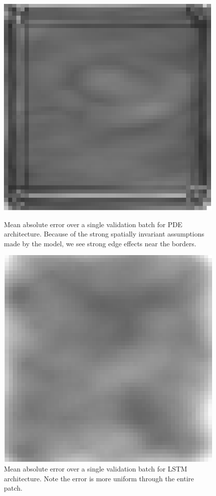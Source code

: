 \documentclass[12pt]{article}
\theoremstyle{plain}
\theoremstyle{remark}
\theoremstyle{definition}
\begin{document}
\begin{figure}
	\begin{minipage}[t]{0.45\linewidth}
		\centering
		\includegraphics[width=0.7\linewidth]{pde_prediction}
		\caption{Mean absolute error over a single validation batch for PDE architecture. Because of the strong spatially invariant assumptions made by the model, we see strong edge effects near the borders. }
		\label{fig:pdeprediction}
	\end{minipage}
	\begin{minipage}[t]{0.1\linewidth}
		\centering
		\hspace{1\linewidth}
	\end{minipage}
	\begin{minipage}[t]{0.45\linewidth}
		\centering
		\includegraphics[width=0.7\linewidth]{lstm_prediction}
		\caption{Mean absolute error over a single validation batch for LSTM architecture. Note the error is more uniform through the entire patch. }
		\label{fig:lstmprediction}
	\end{minipage}
\end{figure}
\end{document}
